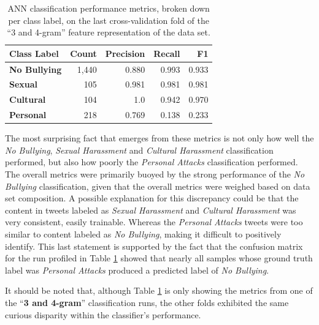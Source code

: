 \documentclass[conference]{sig-alternate-05-2015}
\begin{document}
\begin{table}[ht!]
  \centering
  \begin{tabular}{| l | r | r | r | r |}
    \hline
    \textbf{Class Label} & \textbf{Count} & \textbf{Precision} & \textbf{Recall} & \textbf{F1} \\
    \hline\hline
    \textbf{No Bullying} & 1,440 & 0.880 & 0.993 & 0.933 \\
    \textbf{Sexual} & 105 & 0.981 & 0.981 & 0.981 \\
    \textbf{Cultural} & 104 & 1.0 & 0.942 & 0.970 \\
    \textbf{Personal} & 218 & 0.769 & 0.138 & 0.233 \\
    \hline
  \end{tabular}
  \caption{ANN classification performance metrics, broken down per class label,
  on the last cross-validation fold of the ``3 and 4-gram'' feature
  representation of the data set.}
  \label{tab:ann_byclass_results}
\end{table}

The most surprising fact that emerges from these metrics is not only how well
the \textit{No Bullying}, \textit{Sexual Harassment} and \textit{Cultural
Harassment} classification performed, but also how poorly the \textit{Personal
Attacks} classification performed. The overall metrics were primarily buoyed by
the strong performance of the \textit{No Bullying} classification, given that
the overall metrics were weighed based on data set composition. A possible
explanation for this discrepancy could be that the content in tweets labeled
as \textit{Sexual Harassment} and \textit{Cultural Harassment} was very
consistent, easily trainable. Whereas the \textit{Personal Attacks} tweets were
too similar to content labeled as \textit{No Bullying}, making it difficult to
positively identify. This last statement is supported by the fact that the
confusion matrix for the run profiled in Table \ref{tab:ann_byclass_results}
showed that nearly all samples whose ground truth label was \textit{Personal
Attacks} produced a predicted label of \textit{No Bullying}.\par

It should be noted that, although Table \ref{tab:ann_byclass_results} is only
showing the metrics from one of the ``\textbf{3 and 4-gram}'' classification
runs, the other folds exhibited the same curious disparity within the
classifier's performance.\par
\end{document}
